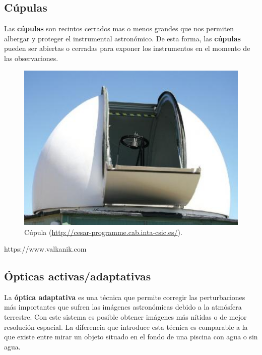 \subsection{Cúpulas}
Las \textbf{cúpulas} son recintos cerrados mas o menos grandes que nos permiten albergar y proteger el instrumental astronómico. De esta forma, las \textbf{cúpulas} pueden ser abiertas o cerradas para exponer los instrumentos en el momento de las observaciones.

\bigskip
\begin{figure}[!ht]
  \begin{center}
  \includegraphics[width=1\textwidth]{../images/cupula.jpg}
  \caption{Cúpula (\url{http://cesar-programme.cab.inta-csic.es/}).}
  \label{fig:diag_scrum}
  \end{center}
\end{figure}
https://www.valkanik.com

\subsection{Ópticas activas/adaptativas}

La \textbf{óptica adaptativa} es una técnica que permite corregir las perturbaciones más importantes que sufren las imágenes astronómicas debido a la atmósfera terrestre. Con este sistema es posible obtener imágenes más nítidas o de mejor resolución espacial. La diferencia que introduce esta técnica es comparable a la que existe entre mirar un objeto situado en el fondo de una piscina con agua o sin agua.

